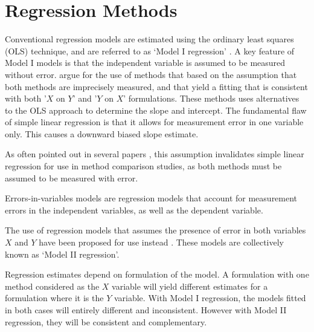 \documentclass[12pt, a4paper]{report}
\theoremstyle{plain}
\theoremstyle{definition}
\theoremstyle{remark}
\begin{document}



\section{Regression Methods}
Conventional regression models are estimated using the ordinary least squares (OLS) technique, and are referred to as `Model I regression' \citep{CornCoch,ludbrook97}. A key feature of Model I models is that the independent variable is assumed to be measured without error. \citet{CornCoch} argue for the use of methods that based on the assumption that both methods are imprecisely measured, and that yield a fitting that is consistent with both '$X$ on $Y$' and '$Y$ on $X$' formulations. These methods uses alternatives to the OLS approach to determine the slope and intercept. The fundamental flaw of simple linear regression is that it allows for measurement error in one variable only. This causes a downward biased slope estimate. 

As often pointed out in several papers
\citep{BA83,ludbrook97}, this assumption invalidates simple linear
regression for use in method comparison studies, as both methods
must be assumed to be measured with error.

Errors-in-variables models are regression models that account for measurement errors in the independent variables, as well as the dependent variable.


The use of regression models that assumes the presence of error in
both variables $X$ and $Y$ have been proposed for use instead
\citep{CornCoch,ludbrook97}. These models are collectively
known as `Model II regression'.

Regression estimates depend on formulation of the model. A
formulation with one method considered as the $X$ variable will
yield different estimates for a formulation where it is the $Y$
variable. With Model I regression, the models fitted in both cases
will entirely different and inconsistent. However with Model II
regression, they will be consistent and complementary.
\end{document}
